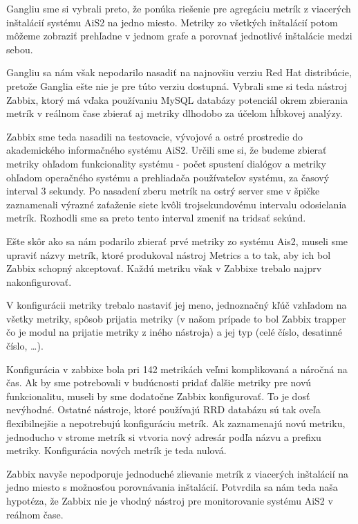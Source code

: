 \documentclass[a4paper, upjsfrontpage, disablespecwarning, thesismargins, thesislinespacing]{rnthesis}
\begin{document}
Gangliu sme si vybrali preto, že ponúka riešenie pre agregáciu metrík z viacerých inštalácií systému AiS2 na jedno miesto.
Metriky zo všetkých inštalácií potom môžeme zobraziť prehľadne v jednom grafe a porovnať jednotlivé inštalácie medzi sebou.

Gangliu sa nám však nepodarilo nasadiť na najnovšiu verziu Red Hat distribúcie, pretože Ganglia ešte nie je pre túto verziu dostupná.
Vybrali sme si teda nástroj Zabbix, ktorý má vďaka používaniu MySQL databázy potenciál okrem zbierania metrík v reálnom čase zbierať aj metriky dlhodobo za účelom hĺbkovej analýzy. 

Zabbix sme teda nasadili na testovacie, vývojové a ostré prostredie do akademického informačného systému AiS2.
Určili sme si, že budeme zbierať metriky ohľadom funkcionality systému - počet spustení dialógov a metriky ohľadom operačného systému a prehliadača používateľov systému, za časový interval 3 sekundy.
Po nasadení zberu metrík na ostrý server sme v špičke zaznamenali výrazné zaťaženie siete kvôli trojsekundovému intervalu odosielania metrík.
Rozhodli sme sa preto tento interval zmeniť na tridsať sekúnd.

Ešte skôr ako sa nám podarilo zbierať prvé metriky zo systému Ais2, 
	museli sme upraviť názvy metrík, ktoré produkoval nástroj Metrics a to tak, aby ich bol Zabbix schopný akceptovať.
Každú metriku však v Zabbixe trebalo najprv nakonfigurovať.

V konfigurácii metriky trebalo nastaviť jej meno, 
	jednoznačný kľúč vzhľadom na všetky metriky, 
	spôsob prijatia metriky (v našom prípade to bol Zabbix trapper čo je modul na prijatie metriky z iného nástroja) a jej typ (celé číslo, desatinné číslo, \ldots).

Konfigurácia v zabbixe bola pri 142 metrikách veľmi komplikovaná a náročná na čas.
Ak by sme potrebovali v budúcnosti pridať ďalšie metriky pre novú funkcionalitu, museli by sme dodatočne Zabbix konfigurovať.
To je dosť nevýhodné.
Ostatné nástroje, ktoré používajú RRD databázu sú tak oveľa flexibilnejšie a nepotrebujú konfiguráciu metrík.
Ak zaznamenajú novú metriku, jednoducho v strome metrík si vtvoria nový adresár podľa názvu a prefixu metriky.
Konfigurácia nových metrík je teda nulová.

Zabbix navyše nepodporuje jednoduché zlievanie metrík z viacerých inštalácií na jedno miesto s možnosťou porovnávania inštalácií.
Potvrdila sa nám teda naša hypotéza, že Zabbix nie je vhodný nástroj pre monitorovanie systému AiS2 v reálnom čase.
\end{document}
